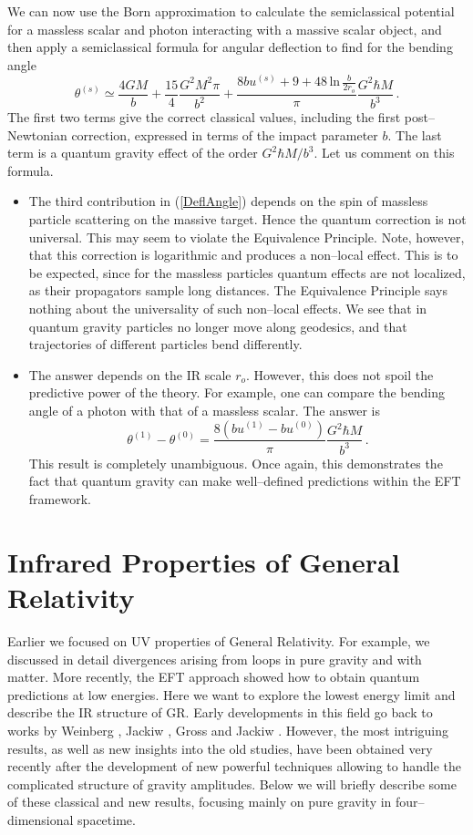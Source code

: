 \documentclass[11pt,a4paper]{article}
\newcommand{\be}{\begin{equation}}
\newcommand{\ee}{\end{equation}}
\begin{document}
We can now use the Born approximation to calculate the semiclassical potential for a massless scalar and photon interacting with a massive scalar object, and then apply a semiclassical formula for angular deflection to find for the bending angle
\be \label{DeflAngle}
\theta^{(s)}\simeq \dfrac{4GM}{b}+\dfrac{15}{4}\dfrac{G^2M^2\pi}{b^2}+\dfrac{8bu^{(s)}+9+48\,\text{ln}\, \frac{b}{2r_o}}{\pi}\dfrac{G^2\hbar M}{b^3}\,.
\ee
The first two terms give the correct classical values, including the first post--Newtonian correction, expressed in terms of the impact parameter $b$. The last term is a quantum gravity effect of the order $G^2\hbar M/b^3$. Let us comment on this formula.
\begin{itemize}
\item The third contribution in (\ref{DeflAngle}) depends on the spin of massless particle scattering on the massive target. Hence the quantum correction is not universal. This may seem to violate the Equivalence Principle. Note, however, that this correction is logarithmic and produces a non--local effect. This is to be expected, since for the massless particles quantum effects are not localized, as their propagators sample long distances. The Equivalence Principle says nothing about the universality of such non--local effects. We see that in quantum gravity particles no longer move along geodesics, and that trajectories of different particles bend differently.
\item The answer depends on the IR scale $r_o$. However, this does not spoil the predictive power of the theory. For example, one can compare the bending angle of a photon with that of a massless scalar. The answer is
\be
\theta^{(1)}-\theta^{(0)}=\dfrac{8(bu^{(1)}-bu^{(0)})}{\pi}\dfrac{G^2\hbar M}{b^3}\,.
\ee
This result is completely unambiguous.
Once again, this demonstrates the fact that quantum gravity can make well--defined predictions within the EFT framework.
\end{itemize}

\section{Infrared Properties of General Relativity}
\label{sec:ir}

Earlier we focused on UV properties of General Relativity. For example, we discussed in detail divergences arising from loops in pure gravity and with matter. More recently, the EFT approach showed how to obtain quantum predictions at low energies. Here we want to explore the lowest energy limit and describe the IR structure of GR. Early developments in this field go back to works by Weinberg \cite{Weinberg:1965nx}, Jackiw \cite{Jackiw:1968zza}, Gross and Jackiw \cite{Gross:1968in}. However, the most intriguing results, as well as new insights into the old studies, have been obtained very recently after the development of new powerful techniques allowing to handle the complicated structure of gravity amplitudes. Below we will briefly describe some of these classical and new results, focusing mainly on pure gravity in four--dimensional spacetime.
\end{document}

